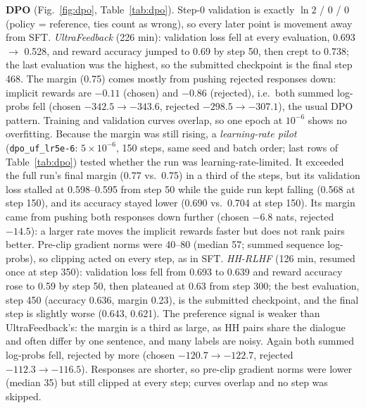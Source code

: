 \documentclass[10pt]{article}
\newcommand{\fp}[1]{\nolinkurl{#1}}
\begin{document}
\textbf{DPO} (Fig.~\ref{fig:dpo}, Table~\ref{tab:dpo}). Step-0 validation is exactly $\ln 2$ / 0 / 0
(policy = reference, ties count as wrong), so every later point is movement away from SFT.
\emph{UltraFeedback} (226 min): validation loss fell at every evaluation, 0.693 $\to$ 0.528, and reward accuracy
jumped to 0.69 by step 50, then crept to 0.738; the last evaluation was the highest, so the submitted checkpoint is
the final step 468. The margin (0.75) comes mostly from pushing rejected responses down: implicit rewards are
$-0.11$ (chosen) and $-0.86$ (rejected), i.e.\ both summed log-probs fell (chosen $-342.5 \to -343.6$, rejected
$-298.5 \to -307.1$), the usual DPO pattern. Training and validation curves overlap, so one epoch at $10^{-6}$ shows
no overfitting. Because the margin was still rising, a \emph{learning-rate pilot} (\fp{dpo_uf_lr5e-6}: $5{\times}10^{-6}$,
150 steps, same seed and batch order; last rows of Table~\ref{tab:dpo}) tested whether the run was learning-rate-limited.
It exceeded the full run's final margin (0.77 vs.\ 0.75) in a third of the steps, but its validation loss stalled at 0.598--0.595
from step 50 while the guide run kept falling (0.568 at step 150), and its accuracy stayed lower (0.690 vs.\ 0.704 at
step 150). Its margin came from pushing both responses down further (chosen $-6.8$ nats, rejected $-14.5$): a larger
rate moves the implicit rewards faster but does not rank pairs better.
Pre-clip gradient norms were 40--80 (median 57; summed sequence log-probs), so clipping acted on every step, as
in SFT.
\emph{HH-RLHF} (126 min, resumed once at step 350): validation loss fell from 0.693 to 0.639 and reward accuracy rose to
0.59 by step 50, then plateaued at 0.63 from step 300; the best evaluation, step 450 (accuracy 0.636, margin 0.23),
is the submitted checkpoint, and the final step is slightly worse (0.643, 0.621). The preference signal is weaker than
UltraFeedback's: the margin is a third as large, as HH pairs share the dialogue and often differ by one sentence, and
many labels are noisy. Again both summed log-probs fell, rejected by more (chosen $-120.7 \to -122.7$, rejected
$-112.3 \to -116.5$). Responses are shorter, so pre-clip gradient norms were lower (median 35) but still clipped at
every step; curves overlap and no step was skipped.

\begin{table}[h]\centering\scriptsize

\caption{DPO validation metrics (1,000 held-out pairs) at step 0, at the submitted best checkpoint and at the final
step. $\bar r = \beta(\log\pi_\theta - \log\pi_{\text{ref}})$ summed over response tokens. Last rows: the 150-step
learning-rate pilot (not a submitted model).}
\label{tab:dpo}
\end{table}
\end{document}
